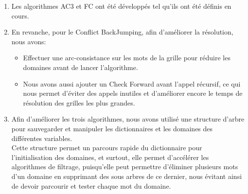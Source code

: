 \documentclass[a4paper,12pt]{report}
\begin{document}
\begin{enumerate}
\item Les algorithmes AC3 et FC ont été développés tel qu'ils ont été définis en cours. \\

\item En revanche, pour le Conflict BackJumping, afin d’améliorer la résolution, nous avons:
\begin{itemize}
\item Effectuer une arc-consistance sur les mots de la grille pour réduire les domaines avant de lancer l'algorithme.
\item Nous avons aussi ajouter un Check Forward avant l'appel récursif, ce qui nous permet d'éviter des appels inutiles et d'améliorer encore le temps de résolution des grilles les plus grandes.\\
\end{itemize}

\item Afin d'améliorer les trois algorithmes, nous avons utilisé une structure d'arbre pour sauvegarder et manipuler les dictionnaires et les domaines des différentes variables.\\
 Cette structure permet un parcours rapide du dictionnaire pour l'initialisation des domaines, et surtout, elle permet d’accélérer les algorithmes de filtrage, puisqu'elle peut permettre d'éliminer plusieurs mots d'un domaine en supprimant des sous arbres de ce dernier, nous évitant ainsi de devoir parcourir et tester chaque mot du domaine.\\
\end{enumerate}
\end{document}
